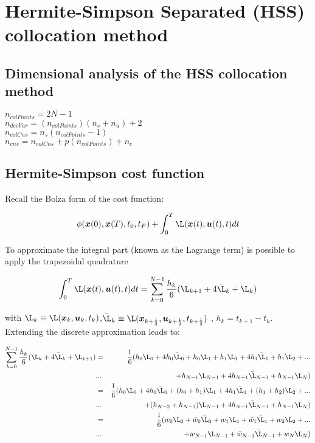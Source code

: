 \documentclass[12pt]{article}
\begin{document}
\section{Hermite-Simpson Separated (HSS) collocation method}

\subsection{Dimensional analysis of the HSS collocation method}

\begin{center}
$n_{colPoints}=2N-1$\\
\vspace{1.5mm}
$n_{decVar}=(n_{colPoints})(n_s+n_u)+2$\\
\vspace{1.5mm}
$n_{colCns}=n_s(n_{colPoints}-1)$\\
\vspace{1.5mm}
$n_{cns}=n_{colCns}+p(n_{colPoints})+n_e$\\
\end{center}

\subsection{Hermite-Simpson cost function}

Recall the Bolza form of the cost function:

\begin{equation}
     \phi(\bm{x}(0),\bm{x}(T),t_0,t_F)+\int_{0}^{T} \L(\bm{x}(t),\bm{u}(t),t) dt
\end{equation}

\noindent To approximate the integral part (known as the Lagrange term) is possible to apply the trapezoidal quadrature

\begin{equation}\label{eq:trap_quad}
    \int_{0}^{T} \L(\bm{x}(t),\bm{u}(t),t) dt =\sum_{k=0}^{N-1}\frac{h_k}{6}(\L_{k+1}+4\bar{\L}_{k}+\L_{k})
\end{equation}

\noindent with $\L_k\equiv \L(\bm{x}_{k},\bm{u}_{k},t_{k})$,$\bar{\L}_k\equiv \L(\bm{x}_{k+\frac{1}{2}},\bm{u}_{k+\frac{1}{2}},t_{k+\frac{1}{2}} )$ ,  $h_k=t_{k+1}-t_k$.\\

\noindent Extending the discrete approximation leads to:

\begin{eqnarray*}
  \sum_{k=0}^{N-1}\frac{h_k}{6}(\L_{k}+4\bar{\L}_{k}+\L_{k+1}) &=& \frac{1}{6}(h_0\L_0+4h_0\bar{\L}_0+h_0\L_1+ h_1\L_1+4h_1\bar{\L}_1+h_1\L_2+ ...\\ &...& +h_{N-1}\L_{N-1}+4h_{N-1}\bar{\L}_{N-1}+h_{N-1}\L_N)\\
  &=&\frac{1}{6}(h_0\L_0+4h_0\bar{\L}_0+(h_0+h_1)\L_1+4h_1\bar{\L}_1+(h_1+h_2)\L_2+ ...\\ &...& +(h_{N-2}+h_{N-1})\L_{N-1}+4h_{N-1}\bar{\L}_{N-1}+h_{N-1}\L_N)\\
  &=&\frac{1}{6}(w_0\L_0+\bar{w}_0\bar{\L}_0+w_1\L_1+\bar{w}_1\bar{\L}_1+w_2\L_2+ ...\\ &...& +w_{N-1}\L_{N-1}+\bar{w}_{N-1}\bar{\L}_{N-1}+w_N\L_N)
\end{eqnarray*}
\end{document}
